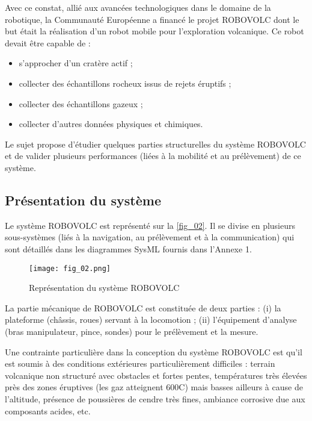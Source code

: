Avec ce constat, allié aux avancées technologiques dans le domaine de la robotique, la
Communauté Européenne a financé le projet ROBOVOLC dont le but était la réalisation d'un robot
mobile pour l'exploration volcanique. Ce robot devait être capable de :
\begin{itemize}
\item s'approcher d'un cratère actif ;
\item collecter des échantillons rocheux issus de rejets éruptifs ;
\item collecter des échantillons gazeux ;
\item collecter d'autres données physiques et chimiques.
\end{itemize}


\begin{obj}
Le sujet propose d'étudier quelques parties structurelles du système ROBOVOLC et de
valider plusieurs performances (liées à la mobilité et au prélèvement) de ce système. 
\end{obj}

\subsection{Présentation du système}


Le système ROBOVOLC est représenté sur la \autoref{fig_02}. Il se divise en plusieurs sous-systèmes
(liés à la navigation, au prélèvement et à la communication) qui sont détaillés dans les
diagrammes SysML fournis dans l'Annexe 1. 

\begin{figure}[H]
\centering
\texttt{[image: fig\_02.png]}
\caption{Représentation du système ROBOVOLC \label{fig_02}}
\end{figure}

La partie mécanique de ROBOVOLC est constituée de deux parties : (i) la plateforme (châssis,
roues) servant à la locomotion ; (ii) l'équipement d'analyse (bras manipulateur, pince, sondes) pour
le prélèvement et la mesure.

Une contrainte particulière dans la conception du système ROBOVOLC est qu'il est soumis à des
conditions extérieures particulièrement difficiles : terrain volcanique non structuré avec obstacles et
fortes pentes, températures très élevées près des zones éruptives (les gaz atteignent 600\degres C) mais
basses ailleurs à cause de l'altitude, présence de poussières de cendre très fines, ambiance
corrosive due aux composants acides, etc.


